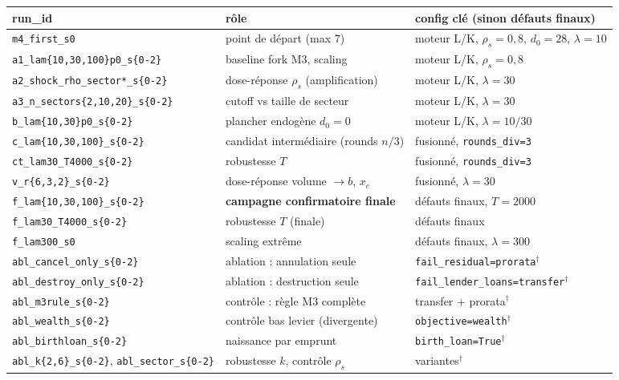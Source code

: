 \documentclass[11pt,a4paper]{article}
\newcommand{\code}[1]{\texttt{#1}}
\begin{document}
{\small
\begin{longtable}{lll}
\toprule
run\_id & rôle & config clé (sinon défauts finaux)\\
\midrule
\code{m4\_first\_s0} & point de départ (max 7) & moteur L/K, $\rho_s{=}0{,}8$, $d_0{=}28$, $\lambda{=}10$\\
\code{a1\_lam\{10,30,100\}p0\_s\{0-2\}} & baseline fork M3, scaling & moteur L/K, $\rho_s{=}0{,}8$\\
\code{a2\_shock\_rho\_sector*\_s\{0-2\}} & dose-réponse $\rho_s$ (amplification) & moteur L/K, $\lambda{=}30$\\
\code{a3\_n\_sectors\{2,10,20\}\_s\{0-2\}} & cutoff vs taille de secteur & moteur L/K, $\lambda{=}30$\\
\code{b\_lam\{10,30\}p0\_s\{0-2\}} & plancher endogène $d_0{=}0$ & moteur L/K, $\lambda{=}10/30$\\
\code{c\_lam\{10,30,100\}\_s\{0-2\}} & candidat intermédiaire (rounds $n/3$) & fusionné, \code{rounds\_div=3}\\
\code{ct\_lam30\_T4000\_s\{0-2\}} & robustesse $T$ & fusionné, \code{rounds\_div=3}\\
\code{v\_r\{6,3,2\}\_s\{0-2\}} & dose-réponse volume $\to b$, $x_c$ & fusionné, $\lambda{=}30$\\
\code{f\_lam\{10,30,100\}\_s\{0-2\}} & \textbf{campagne confirmatoire finale} & défauts finaux, $T{=}2000$\\
\code{f\_lam30\_T4000\_s\{0-2\}} & robustesse $T$ (finale) & défauts finaux\\
\code{f\_lam300\_s0} & scaling extrême & défauts finaux, $\lambda{=}300$\\
\code{abl\_cancel\_only\_s\{0-2\}} & ablation : annulation seule & \code{fail\_residual=prorata}$^\dagger$\\
\code{abl\_destroy\_only\_s\{0-2\}} & ablation : destruction seule & \code{fail\_lender\_loans=transfer}$^\dagger$\\
\code{abl\_m3rule\_s\{0-2\}} & contrôle : règle M3 complète & transfer $+$ prorata$^\dagger$\\
\code{abl\_wealth\_s\{0-2\}} & contrôle bas levier (divergente) & \code{objective=wealth}$^\dagger$\\
\code{abl\_birthloan\_s\{0-2\}} & naissance par emprunt & \code{birth\_loan=True}$^\dagger$\\
\code{abl\_k\{2,6\}\_s\{0-2\}}, \code{abl\_sector\_s\{0-2\}} & robustesse $k$, contrôle $\rho_s$ & variantes$^\dagger$\\
\bottomrule
\end{longtable}
}
\end{document}
